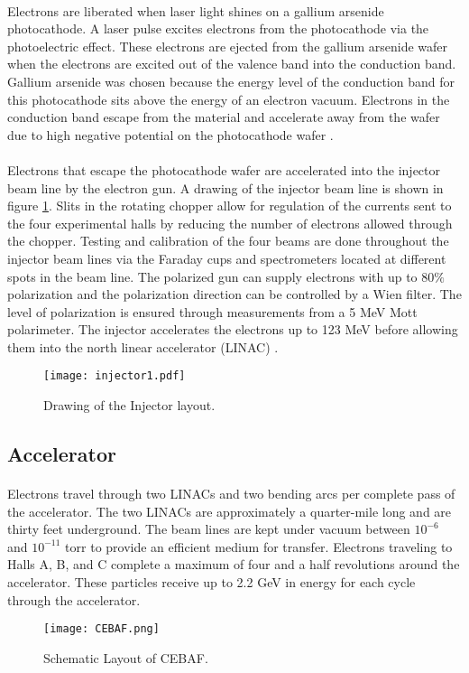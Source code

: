 	\paragraph{}Electrons are liberated when laser light shines on a gallium arsenide photocathode. A laser pulse excites electrons from the photocathode via the photoelectric effect. These  electrons are ejected from the gallium arsenide wafer when the electrons are excited out of the valence band into the conduction band. Gallium arsenide was chosen because the energy level of the conduction band for this photocathode sits above the energy of an electron vacuum. Electrons in the conduction band escape from the material and accelerate away from the wafer due to high negative potential on the photocathode wafer \cite{sane}. 
	\paragraph{}Electrons that escape the photocathode wafer are accelerated into the injector beam line by the electron gun. A drawing of the injector beam line is shown in figure \ref{fig:inj}. Slits in the rotating chopper allow for regulation of the currents sent to the four experimental halls by reducing the number of electrons allowed through the chopper. Testing and calibration of the four beams are done throughout the injector beam lines via the Faraday cups and spectrometers located at different spots in the beam line. The polarized gun can supply electrons with up to 80$\%$ polarization and the polarization direction can be controlled by a Wien filter. The level of polarization is ensured through measurements from a 5 MeV Mott polarimeter\cite{HallA}. The injector accelerates the electrons up to 123 MeV before allowing them into the north linear accelerator (LINAC) \cite{ref:4beams,CEBAF,ref:photogun}.
		\begin{figure}[t]
		\centering
		\texttt{[image: injector1.pdf]} 
		\caption{Drawing of the Injector layout. }
		\label{fig:inj}
	\end{figure} 
	
	
\subsection{Accelerator}
	\paragraph{} Electrons travel through two LINACs and two bending arcs per complete pass of the accelerator. The two LINACs are approximately a quarter-mile long and are thirty feet underground. The beam lines are kept under vacuum between $10^{-6}$ and $10^{-11}$ torr to provide an efficient medium for transfer.  Electrons traveling to Halls A, B, and C complete a maximum of four and a half revolutions around the accelerator. These particles receive up to 2.2 GeV in energy for each cycle through the accelerator. 
	\begin{figure}[t]
		\centering
		\texttt{[image: CEBAF.png]} 
				\caption{Schematic Layout of CEBAF. }
		\label{CEBAF}
   \end{figure} 


